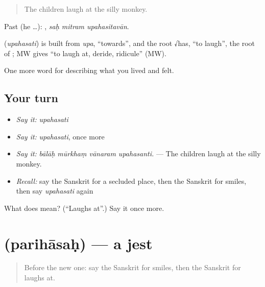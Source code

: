 \begin{quote}
The children laugh at the silly monkey.
\end{quote}

Past (he …):   , \emph{saḥ mitram upahasitavān}.

\begin{cousinweb}
\textbf{} (\emph{upahasati}) is built from \emph{upa}, \textquotedblleft{}towards\textquotedblright{}, and the root √has, \textquotedblleft{}to laugh\textquotedblright{}, the root of \textbf{}; MW gives \textquotedblleft{}to laugh at, deride, ridicule\textquotedblright{} (MW).
\end{cousinweb}

\begin{grammarlens}[title={What you've built}]
One more word for describing what you lived and felt.
\end{grammarlens}

\subsection*{Your turn}
\begin{itemize}
\raggedright
  \item \emph{Say it:} \emph{upahasati}
  \item \emph{Say it:} \emph{upahasati}, once more
  \item \emph{Say it:} \emph{bālāḥ mūrkhaṃ vānaram upahasanti.} — The children laugh at the silly monkey.
  \item \emph{Recall:} say the Sanskrit for a secluded place, then the Sanskrit for smiles, then say \emph{upahasati} again
\end{itemize}

\begin{tcolorbox}[breakable,colback=teal!4,colframe=teal!35!black,title={Before you move on}]
What does  mean? (\textquotedblleft{}Laughs at\textquotedblright{}.) Say it once more.
\end{tcolorbox}
\section[\texorpdfstring{\sk{परिहासः} (parihāsaḥ)}{परिहासः (parihāsaḥ)}]{ (parihāsaḥ) — a jest}

\label{lesson:SA-C457-parihasah}



\begin{quote}
Before the new one: say the Sanskrit for smiles, then the Sanskrit for laughs at.
\end{quote}

